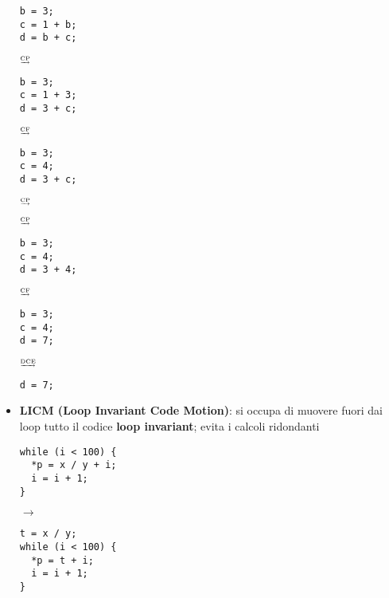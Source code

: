 \begin{itemize}
      \begin{minipage}[c]{.25\textwidth}
        \begin{lstlisting}
b = 3;
c = 1 + b;
d = b + c;\end{lstlisting}
      \end{minipage}
      \hfill $\tiny\underrightarrow{\text{CP}}$ \hfill
      \begin{minipage}[c]{.25\textwidth}
        \begin{lstlisting}
b = 3;
c = 1 + 3;
d = 3 + c;\end{lstlisting}
      \end{minipage}
      \hfill $\tiny\underrightarrow{\text{CF}}$ \hfill
      \begin{minipage}[c]{.25\textwidth}
        \begin{lstlisting}
b = 3;
c = 4;
d = 3 + c;\end{lstlisting}
      \end{minipage}
      \hfill $\tiny\underrightarrow{\text{CP}}$ \hfill

      \hfill $\tiny\underrightarrow{\text{CP}}$ \hfill
      \begin{minipage}[c]{.25\textwidth}
        \begin{lstlisting}
b = 3;
c = 4;
d = 3 + 4;\end{lstlisting}
      \end{minipage}
      \hfill $\tiny\underrightarrow{\text{CF}}$ \hfill
      \begin{minipage}[c]{.25\textwidth}
        \begin{lstlisting}
b = 3;
c = 4;
d = 7;\end{lstlisting}
      \end{minipage}
      \hfill $\tiny\underrightarrow{\text{DCE}}$ \hfill
      \begin{minipage}[c]{.25\textwidth}
        \begin{lstlisting}
d = 7;\end{lstlisting}
      \end{minipage}
    \item \textbf{LICM (Loop Invariant Code Motion)}: si occupa di muovere fuori dai loop tutto il codice \textbf{loop invariant}; evita i calcoli ridondanti\\
      \begin{minipage}[c]{.4\textwidth}
        \begin{lstlisting}
while (i < 100) {
  *p = x / y + i;
  i = i + 1;
}\end{lstlisting}
    \end{minipage}
    \hfill $\rightarrow$ \hfill
    \begin{minipage}[c]{.4\textwidth}
      \begin{lstlisting}
t = x / y;
while (i < 100) {
  *p = t + i;
  i = i + 1;
}\end{lstlisting}
  \end{minipage}
\end{itemize}

